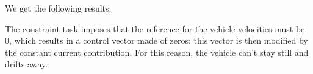\documentclass{article}
\begin{document}
We get the following results:
\begin{figure}[H]
	\centering
	\hspace{10mm}
	\label{fig:ex4.1.3ConstantCurrent}
\end{figure}
The constraint task imposes that the reference for the vehicle velocities must be 0, which results in a control vector made of zeros: this vector is then modified by the constant current contribution. For this reason, the vehicle can't stay still and drifts away.
\end{document}
